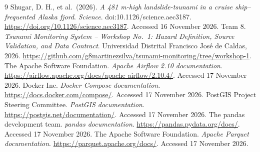 \documentclass[a4paper,11pt,oneside]{book}
\begin{document}
\begin{thebibliography}{9}
Shugar, D. H., et al.\ (2026).
\emph{A 481 m-high landslide-tsunami in a
cruise ship--frequented Alaska fjord}.
\textit{Science}. doi:10.1126/science.aec3187.
\url{https://doi.org/10.1126/science.aec3187}.
Accessed 16 November 2026.
 Team 8. \emph{Tsunami Monitoring System -- Workshop No.~1: Hazard Definition, Source Validation, and Data Contract}. Universidad Distrital Francisco Jos\'e de Caldas, 2026. \url{https://github.com/g8martinezsilva/tsunami-monitoring/tree/workshop-1}.
 The Apache Software Foundation. \emph{Apache Airflow 2.10 documentation}. \url{https://airflow.apache.org/docs/apache-airflow/2.10.4/}. Accessed 17 November 2026.
 Docker Inc. \emph{Docker Compose documentation}. \url{https://docs.docker.com/compose/}. Accessed 17 November 2026.
 PostGIS Project Steering Committee. \emph{PostGIS documentation}. \url{https://postgis.net/documentation/}. Accessed 17 November 2026.
 The pandas development team. \emph{pandas documentation}. \url{https://pandas.pydata.org/docs/}. Accessed 17 November 2026.
 The Apache Software Foundation. \emph{Apache Parquet documentation}. \url{https://parquet.apache.org/docs/}. Accessed 17 November 2026.
\end{thebibliography}
\end{document}
